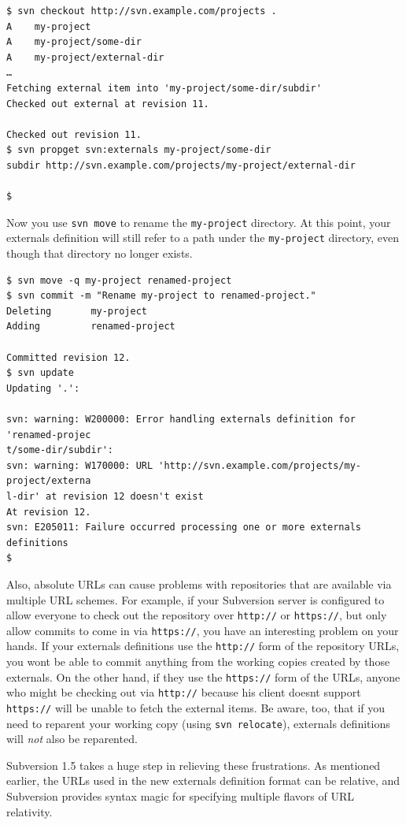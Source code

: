 \begin{verbatim}
$ svn checkout http://svn.example.com/projects .
A    my-project
A    my-project/some-dir
A    my-project/external-dir
…
Fetching external item into 'my-project/some-dir/subdir'
Checked out external at revision 11.

Checked out revision 11.
$ svn propget svn:externals my-project/some-dir
subdir http://svn.example.com/projects/my-project/external-dir

$
\end{verbatim}

Now you use \texttt{svn\ move} to rename the \texttt{my-project}
directory. At this point, your externals definition will still refer to
a path under the \texttt{my-project} directory, even though that
directory no longer exists.

\begin{verbatim}
$ svn move -q my-project renamed-project
$ svn commit -m "Rename my-project to renamed-project."
Deleting       my-project
Adding         renamed-project

Committed revision 12.
$ svn update
Updating '.':

svn: warning: W200000: Error handling externals definition for 'renamed-projec
t/some-dir/subdir':
svn: warning: W170000: URL 'http://svn.example.com/projects/my-project/externa
l-dir' at revision 12 doesn't exist
At revision 12.
svn: E205011: Failure occurred processing one or more externals definitions
$
\end{verbatim}

Also, absolute URLs can cause problems with repositories that are
available via multiple URL schemes. For example, if your Subversion
server is configured to allow everyone to check out the repository over
\texttt{http://} or \texttt{https://}, but only allow commits to come in
via \texttt{https://}, you have an interesting problem on your hands. If
your externals definitions use the \texttt{http://} form of the
repository URLs, you won\textquotesingle t be able to commit anything
from the working copies created by those externals. On the other hand,
if they use the \texttt{https://} form of the URLs, anyone who might be
checking out via \texttt{http://} because his client
doesn\textquotesingle t support \texttt{https://} will be unable to
fetch the external items. Be aware, too, that if you need to reparent
your working copy (using \texttt{svn\ relocate}), externals definitions
will \emph{not} also be reparented.

Subversion 1.5 takes a huge step in relieving these frustrations. As
mentioned earlier, the URLs used in the new externals definition format
can be relative, and Subversion provides syntax magic for specifying
multiple flavors of URL relativity.

